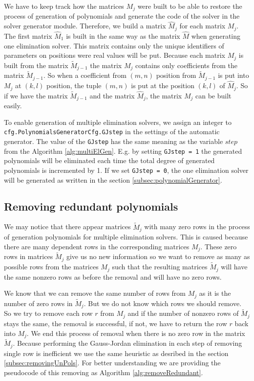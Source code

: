 

We have to keep track how the matrices $M_j$ were built to be able to restore the process of generation of polynomials and generate the code of the solver in the solver generator module. Therefore, we build a matrix $\hat{M}_j$ for each matrix $M_j$. The first matrix $\hat{M}_1$ is built in the same way as the matrix $\hat{M}$ when generating one elimination solver. This matrix contains only the unique identifiers of parameters on positions were real values will be put. Because each matrix $M_j$ is built from the matrix $\tilde{M}_{j-1}$ the matrix $M_j$ contains only coefficients from the matrix $\tilde{M}_{j-1}$. So when a coefficient from $(m,n)$ position from $\tilde{M}_{j-1}$ is put into $M_j$ at $(k, l)$ position, the tuple $(m, n)$ is put at the position $(k, l)$ of $\hat{M}_j$. So if we have the matrix $\tilde{M}_{j-1}$ and the matrix $\hat{M}_j$, the matrix $M_j$ can be built easily.

To enable generation of multiple elimination solvers, we assign an integer to \texttt{cfg.Poly\-nomials\-Gene\-rator\-Cfg.GJstep} in the settings of the automatic generator. The value of the \texttt{GJstep} has the same meaning as the variable $step$ from the Algorithm \ref{alg:multiElGen}. E.g. by setting \texttt{GJstep = 1} the generated polynomials will be eliminated each time the total degree of generated polynomials is incremented by 1. If we set \texttt{GJstep = 0}, the one elimination solver will be generated as written in the section \ref{subsec:polynomialGenerator}.

\subsection{Removing redundant polynomials}
\label{subsec:removeRedundant}
We may notice that there appear matrices $\tilde{M}_j$ with many zero rows in the process of generation polynomials for multiple elimination solvers. This is caused because there are many dependent rows in the corresponding matrices $M_j$. These zero rows in matrices $\tilde{M}_j$ give us no new information so we want to remove as many as possible rows from the matrices $M_j$ such that the resulting matrices $\tilde{M}_j$ will have the same nonzero rows as before the removal and will have no zero rows.

We know that we can remove the same number of rows from $M_j$ as it is the number of zero rows in $\tilde{M}_j$. But we do not know which rows we should remove. So we try to remove each row $r$ from $M_j$ and if the number of nonzero rows of $\tilde{M}_j$ stays the same, the removal is successful, if not, we have to return the row $r$ back into $M_j$. We end this process of removal when there is no zero row in the matrix $\tilde{M}_j$. Because performing the Gauss-Jordan elimination in each step of removing single row is inefficient we use the same heuristic as desribed in the section \ref{subsec:removingUnPols}. For better understanding we are providing the pseudocode of this removing as Algorithm \ref{alg:removeRedundant}.

